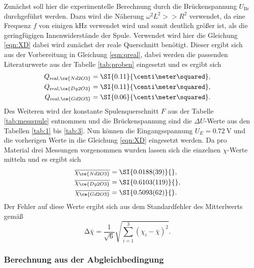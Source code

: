 Zunächst soll hier die experimentelle Berechnung durch die Brückenspannung $U_{\text{Br}}$ durchgeführt werden. Dazu wird die Näherung
$\omega^2 L^2 >> R^2$ verwendet, da eine Frequenz $f$ von einigen $\si{\kilo\hertz}$ verwendet wird und somit deutlich größer ist, als die geringfügigen Innenwiderstände der Spule.
Verwendet wird hier die Gleichung \eqref{eqn:XD} dabei wird zunächst der reale Querschnitt benötigt. Dieser ergibt sich aus der Vorbereitung in Gleichung \eqref{eqn:qreal}, dabei werden die passenden Literaturwerte aus der Tabelle
\ref{tab:proben} eingesetzt und es ergibt sich
\begin{align}
    \label{eqn:11}
    Q_{\text{real,}\ce{Nd2O3}} &= \SI{0.11}{\centi\meter\squared},\\
    \label{eqn:12}
    Q_{\text{real,}\ce{Dy2O3}} &= \SI{0.11}{\centi\meter\squared},\\
    \label{eqn:13}
    Q_{\text{real,}\ce{Gd2O3}} &= \SI{0.06}{\centi\meter\squared}.
\end{align}
Des Weiteren wird der konstante Spulenquerschnitt $F$ aus der Tabelle \ref{tab:messspule} entnommen und die Brückenspannung sind die $\Delta U$-Werte aus den Tabellen \ref{tab:1} bis \ref{tab:3}. Nun können die Eingangsspannung $U_E = \SI{0.72}{\volt}$ und die vorherigen Werte in die Gleichung \eqref{eqn:XD} eingesetzt werden.
Da pro Material drei Messungen vorgenommen wurden lassen sich die einzelnen $\chi$-Werte mitteln und es ergibt sich
\begin{align}
    \overline{\chi_{\ce{Nd2O3}}} &= \SI{0.0188(39)}{},\\
    \overline{\chi_{\ce{Dy2O3}}} &= \SI{0.6103(119)}{},\\
    \overline{\chi_{\ce{Gd2O3}}} &= \SI{0.5093(62)}{}.
\end{align}
Der Fehler auf diese Werte ergibt sich aus dem Standardfehler des Mitterlwerts gemäß
\begin{equation}
    \increment \bar{\chi} = \frac{1}{\sqrt{6}} \sqrt{\sum_{i=1}^{3} (\chi_{i} -\bar{\chi})^2 }.
\end{equation}

\subsubsection{Berechnung aus der Abgleichbedingung}


